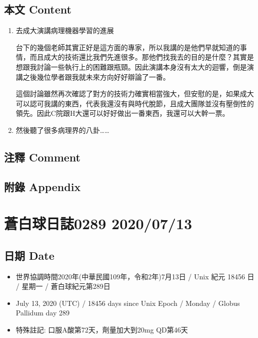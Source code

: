 \documentclass[a5paper, 11pt
]{book}
\providecommand{\tightlist}{%
  \setlength{\itemsep}{0pt}\setlength{\parskip}{0pt}}
\begin{document}
\hypertarget{ux672cux6587-content-41}{%
\subsection{本文 Content}\label{ux672cux6587-content-41}}

\begin{enumerate}
\def\labelenumi{\arabic{enumi}.}
\item
  去成大演講病理機器學習的進展

  台下的幾個老師其實正好是這方面的專家，所以我講的是他們早就知道的事情，而且成大的技術還比我們先進很多。那他們找我去的目的是什麼？其實是想跟我討論一些執行上的困難跟瓶頸。因此演講本身沒有太大的迴響，倒是演講之後幾位學者跟我就未來方向好好辯論了一番。

  這個討論雖然再次確認了對方的技術力確實相當強大，但安慰的是，如果成大可以認可我講的東西，代表我還沒有與時代脫節，且成大團隊並沒有壓倒性的領先。因此C院跟H大還可以好好做出一番東西，我還可以大幹一票。
\item
  然後聽了很多病理界的八卦\ldots\ldots{}
\end{enumerate}

\hypertarget{ux6ce8ux91cb-comment-41}{%
\subsection{注釋 Comment}\label{ux6ce8ux91cb-comment-41}}

\hypertarget{ux9644ux9304-appendix-41}{%
\subsection{附錄 Appendix}\label{ux9644ux9304-appendix-41}}

\hypertarget{ux84bcux767dux7403ux65e5ux8a8c0289-20200713}{%
\section{蒼白球日誌0289
2020/07/13}\label{ux84bcux767dux7403ux65e5ux8a8c0289-20200713}}

\hypertarget{ux65e5ux671f-date-42}{%
\subsection{日期 Date}\label{ux65e5ux671f-date-42}}

\begin{itemize}
\tightlist
\item
  世界協調時間2020年(中華民國109年，令和2年)7月13日 / Unix 紀元 18456 日
  / 星期一 / 蒼白球紀元第289日
\item
  July 13, 2020 (UTC) / 18456 days since Unix Epoch / Monday / Globus
  Pallidum day 289
\item
  特殊註記: 口服A酸第72天，劑量加大到20mg QD第46天
\end{itemize}
\end{document}
